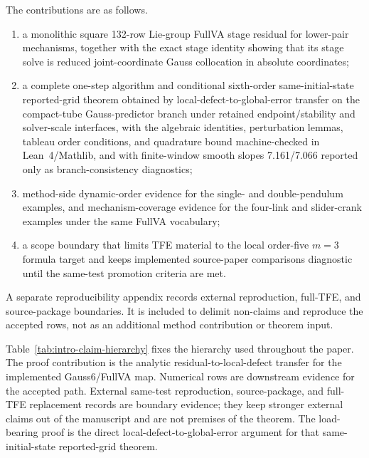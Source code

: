 \documentclass[preprint,12pt]{elsarticle}
\newcommand{\method}{Gauss6\slash FullVA}
\newcommand{\tfe}{TFE}
\begin{document}
The contributions are as follows.
\begin{enumerate}
  \item a monolithic square 132-row Lie-group FullVA stage residual for
  lower-pair mechanisms, together with the exact stage identity showing that
  its stage solve is reduced joint-coordinate Gauss collocation in absolute
  coordinates;
  \item a complete one-step algorithm and conditional sixth-order
  same-initial-state reported-grid theorem obtained by
  local-defect-to-global-error transfer on the compact-tube Gauss-predictor branch
  under retained endpoint/stability and solver-scale interfaces, with the
  algebraic identities, perturbation lemmas, tableau order conditions, and
  quadrature bound machine-checked in Lean~4/Mathlib, and with finite-window
  smooth slopes 7.161/7.066 reported only as branch-consistency diagnostics;
  \item method-side dynamic-order evidence for the single- and
  double-pendulum examples, and mechanism-coverage evidence for the four-link
  and slider-crank examples under the same FullVA vocabulary;
  \item a scope boundary that limits \tfe{} material to the local
  order-five \(m=3\) formula target and keeps implemented source-paper
  comparisons diagnostic until the same-test promotion criteria are met.
\end{enumerate}
A separate reproducibility appendix records external reproduction,
full-\tfe{}, and source-package boundaries. It is included to delimit
non-claims and reproduce the accepted rows, not as an additional method
contribution or theorem input.

Table~\ref{tab:intro-claim-hierarchy} fixes the hierarchy used throughout the
paper.  The proof contribution is the analytic residual-to-local-defect
transfer for the implemented \method{} map.  Numerical rows are downstream
evidence for the accepted path.  External same-test reproduction,
source-package, and full-\tfe{} replacement records are boundary evidence;
they keep stronger external claims out of the manuscript and are not premises of
the theorem.
The load-bearing proof is the direct local-defect-to-global-error argument for
that same-initial-state reported-grid theorem.
\end{document}
